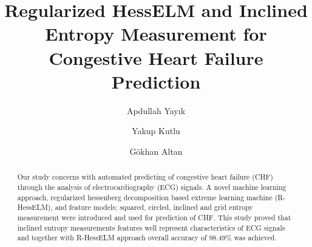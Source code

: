 \documentclass[twocolumn]{svjour3}
\begin{document}
\title{Regularized HessELM and Inclined Entropy Measurement for Congestive Heart Failure Prediction}









\author{Apdullah Yay{\i}k \and Yakup Kutlu \and G\"{o}khan Altan}










\maketitle
\begin{abstract}
Our study concerns with automated predicting of congestive heart failure (CHF) through the analysis of electrocardiography (ECG) signals. A novel machine learning approach, regularized hessenberg decomposition based extreme learning machine (R-HessELM), and feature models; squared, circled, inclined and grid entropy measurement were introduced and used for prediction of CHF. This study proved that inclined entropy measurements features well represent characteristics of ECG signals and together with R-HessELM approach overall accuracy of 98.49\% was achieved.

\end{abstract}
\end{document}
